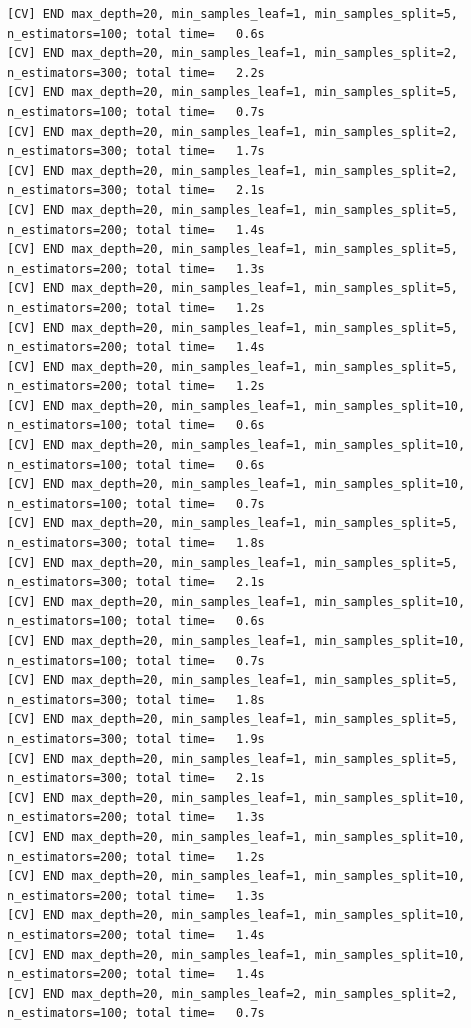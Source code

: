 \documentclass[
  11pt,
  letterpaper,
  DIV=11,
  numbers=noendperiod]{scrartcl}
\begin{document}
\begin{verbatim}
[CV] END max_depth=20, min_samples_leaf=1, min_samples_split=5, n_estimators=100; total time=   0.6s
[CV] END max_depth=20, min_samples_leaf=1, min_samples_split=2, n_estimators=300; total time=   2.2s
[CV] END max_depth=20, min_samples_leaf=1, min_samples_split=5, n_estimators=100; total time=   0.7s
[CV] END max_depth=20, min_samples_leaf=1, min_samples_split=2, n_estimators=300; total time=   1.7s
[CV] END max_depth=20, min_samples_leaf=1, min_samples_split=2, n_estimators=300; total time=   2.1s
[CV] END max_depth=20, min_samples_leaf=1, min_samples_split=5, n_estimators=200; total time=   1.4s
[CV] END max_depth=20, min_samples_leaf=1, min_samples_split=5, n_estimators=200; total time=   1.3s
[CV] END max_depth=20, min_samples_leaf=1, min_samples_split=5, n_estimators=200; total time=   1.2s
[CV] END max_depth=20, min_samples_leaf=1, min_samples_split=5, n_estimators=200; total time=   1.4s
[CV] END max_depth=20, min_samples_leaf=1, min_samples_split=5, n_estimators=200; total time=   1.2s
[CV] END max_depth=20, min_samples_leaf=1, min_samples_split=10, n_estimators=100; total time=   0.6s
[CV] END max_depth=20, min_samples_leaf=1, min_samples_split=10, n_estimators=100; total time=   0.6s
[CV] END max_depth=20, min_samples_leaf=1, min_samples_split=10, n_estimators=100; total time=   0.7s
[CV] END max_depth=20, min_samples_leaf=1, min_samples_split=5, n_estimators=300; total time=   1.8s
[CV] END max_depth=20, min_samples_leaf=1, min_samples_split=5, n_estimators=300; total time=   2.1s
[CV] END max_depth=20, min_samples_leaf=1, min_samples_split=10, n_estimators=100; total time=   0.6s
[CV] END max_depth=20, min_samples_leaf=1, min_samples_split=10, n_estimators=100; total time=   0.7s
[CV] END max_depth=20, min_samples_leaf=1, min_samples_split=5, n_estimators=300; total time=   1.8s
[CV] END max_depth=20, min_samples_leaf=1, min_samples_split=5, n_estimators=300; total time=   1.9s
[CV] END max_depth=20, min_samples_leaf=1, min_samples_split=5, n_estimators=300; total time=   2.1s
[CV] END max_depth=20, min_samples_leaf=1, min_samples_split=10, n_estimators=200; total time=   1.3s
[CV] END max_depth=20, min_samples_leaf=1, min_samples_split=10, n_estimators=200; total time=   1.2s
[CV] END max_depth=20, min_samples_leaf=1, min_samples_split=10, n_estimators=200; total time=   1.3s
[CV] END max_depth=20, min_samples_leaf=1, min_samples_split=10, n_estimators=200; total time=   1.4s
[CV] END max_depth=20, min_samples_leaf=1, min_samples_split=10, n_estimators=200; total time=   1.4s
[CV] END max_depth=20, min_samples_leaf=2, min_samples_split=2, n_estimators=100; total time=   0.7s

\end{verbatim}
\end{document}
